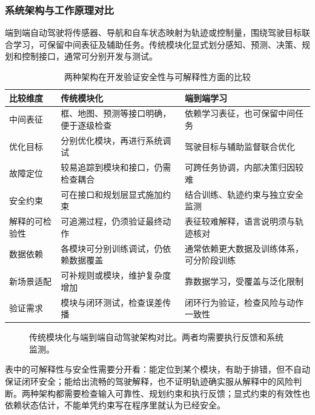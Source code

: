 \documentclass[UTF8,zihao=-4,fontset=windows]{ctexart}
\begin{document}
\subsubsection{系统架构与工作原理对比}
端到端自动驾驶将传感器、导航和自车状态映射为轨迹或控制量，围绕驾驶目标联合学习，可保留中间表征及辅助任务。传统模块化显式划分感知、预测、决策、规划和控制接口，通常可分别开发与测试。
\begin{table}[H]\centering\small\caption{两种架构在开发验证安全性与可解释性方面的比较}
\begin{tabularx}{\textwidth}{p{2.0cm}XX}\toprule
比较维度 & 传统模块化 & 端到端学习\\\midrule
中间表征 & 框、地图、预测等接口明确，便于逐级检查 & 依赖学习表征，也可保留中间任务\\
优化目标 & 分别优化模块，再进行系统调试 & 驾驶目标与辅助监督联合优化\\
故障定位 & 较易追踪到模块和接口，仍需检查耦合 & 可跨任务协调，内部决策归因较难\\
安全约束 & 可在接口和规划层显式施加约束 & 结合训练、轨迹约束与独立安全监测\\
解释的可检验性 & 可追溯过程，仍须验证最终动作 & 表征较难解释，语言说明须与轨迹核对\\
数据依赖 & 各模块可分别训练调试，仍依赖数据覆盖 & 通常依赖更大数据及训练体系，可分阶段训练\\
新场景适配 & 可补规则或模块，维护复杂度增加 & 靠数据学习，受覆盖与泛化限制\\
验证需求 & 模块与闭环测试，检查误差传播 & 闭环行为验证，检查风险与动作一致性\\\bottomrule\end{tabularx}\end{table}
\begin{figure}[H]\centering
{}\caption{传统模块化与端到端自动驾驶架构对比。两者均需要执行反馈和系统监测。}\label{fig:compare}\end{figure}
表中的可解释性与安全性需要分开看：能定位到某个模块，有助于排错，但不自动保证闭环安全；能给出流畅的驾驶解释，也不证明轨迹确实服从解释中的风险判断。两种架构都需要检查输入可靠性、规划约束和执行反馈；显式约束的有效性也依赖状态估计，不能单凭约束写在程序里就认为已经安全。
\end{document}
